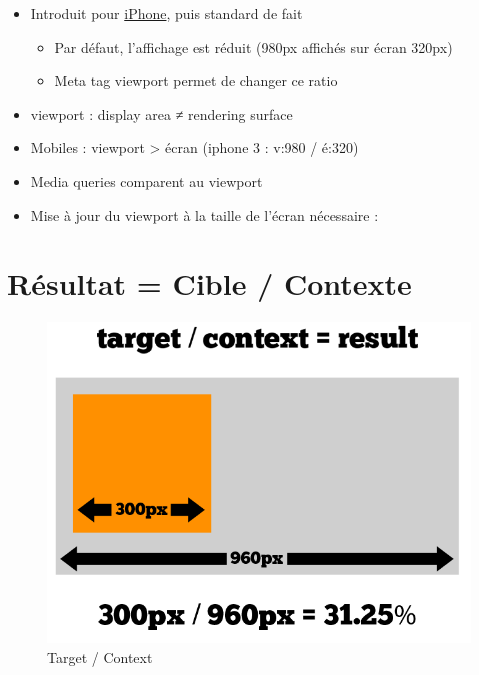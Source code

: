 \begin{itemize}
\tightlist
\item
  Introduit pour
  \href{https://developer.apple.com/library/content/documentation/AppleApplications/Reference/SafariWebContent/UsingtheViewport/UsingtheViewport.html}{iPhone},
  puis standard de fait

  \begin{itemize}
  \tightlist
  \item
    Par défaut, l'affichage est réduit (980px affichés sur écran 320px)
  \item
    Meta tag viewport permet de changer ce ratio
  \end{itemize}
\item
  viewport : display area ≠ rendering surface
\item
  Mobiles : viewport \textgreater{} écran (iphone 3 : v:980 / é:320)
\item
  Media queries comparent au viewport
\item
  Mise à jour du viewport à la taille de l'écran nécessaire :
\end{itemize}

\begin{english}

\begin{Shaded}
\begin{Highlighting}[]
\KeywordTok{\textgreater{}}
\end{Highlighting}
\end{Shaded}

\end{english}

\hypertarget{ruxe9sultat-cible-contexte}{%
\section{Résultat = Cible / Contexte}\label{ruxe9sultat-cible-contexte}}

\begin{figure}
\centering
\includegraphics{src/img/target-context.png}
\caption{Target / Context}
\end{figure}

